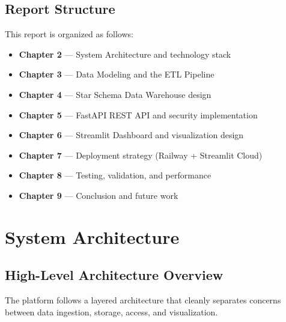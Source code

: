 \documentclass[12pt, a4paper]{report}
\begin{document}
\section{Report Structure}

This report is organized as follows:

\begin{itemize}
  \item \textbf{Chapter 2} — System Architecture and technology stack
  \item \textbf{Chapter 3} — Data Modeling and the ETL Pipeline
  \item \textbf{Chapter 4} — Star Schema Data Warehouse design
  \item \textbf{Chapter 5} — FastAPI REST API and security implementation
  \item \textbf{Chapter 6} — Streamlit Dashboard and visualization design
  \item \textbf{Chapter 7} — Deployment strategy (Railway + Streamlit Cloud)
  \item \textbf{Chapter 8} — Testing, validation, and performance
  \item \textbf{Chapter 9} — Conclusion and future work
\end{itemize}

\chapter{System Architecture}

\section{High-Level Architecture Overview}

The platform follows a layered architecture that cleanly separates concerns between data ingestion, storage, access, and visualization.
\end{document}
